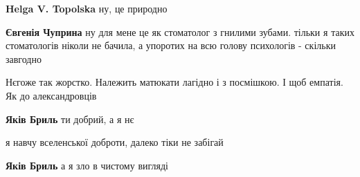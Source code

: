 \begin{itemize}
\begin{itemize}
\textbf{Helga V. Topolska} ну, це природно

 
\textbf{Євгенія Чуприна} ну для мене це як стоматолог з гнилими зубами. тільки
я таких стоматологів ніколи не бачила, а упоротих на всю голову психологів -
скільки завгодно
\end{itemize}

 
Нєгоже так жорстко. Належить матюкати лагідно і з посмішкою. І щоб емпатія. Як до александровців

\begin{itemize}
 
\textbf{Яків Бриль} ти добрий, а я нє

 
я навчу вселенської доброти, далеко тіки не забігай

 
\textbf{Яків Бриль} а я зло в чистому вигляді

 

\end{itemize}
\end{itemize}
